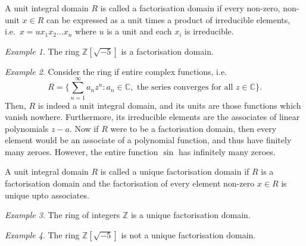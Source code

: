 \documentclass[11pt]{article}
\newcommand{\C}{\mathbb{C}}
\newcommand{\Z}{\mathbb{Z}}
\theoremstyle{definition}
\theoremstyle{remark}
\newtheorem*{example}{Example}
\numberwithin{equation}{section}
\begin{document}
    \begin{definition}
        A unit integral domain $R$ is called a factorisation domain if every
        non-zero, non-unit $x\in R$ can be expressed as a unit times a product of
        irreducible elements, i.e.\ $x = ux_1x_2\dots x_n$ where $u$ is a unit and
        each $x_i$ is irreducible.
    \end{definition}
    \begin{example}
        The ring $\Z[\sqrt{-5}]$ is a factorisation domain.
    \end{example}
    \begin{example}
        Consider the ring if entire complex functions, i.e.\ \[
            R = \{\sum_{n = 1}^\infty a_nz^n: a_n \in \C, \text{ the series converges
            for all } z \in \C\}.
        \] Then, $R$ is indeed a unit integral domain, and its units are those
        functions which vanish nowhere. Furthermore, its irreducible elements are the
        associates of linear polynomials $z - a$. Now if $R$ were to be a
        factorisation domain, then every element would be an associate of a
        polynomial function, and thus have finitely many zeroes. However, the entire
        function $\sin$ has infinitely many zeroes.
    \end{example}


    \begin{definition}
        A unit integral domain $R$ is called a unique factorisation domain if $R$ is
        a factorisation domain and the factorisation of every element non-zero $x \in
        R$ is unique upto associates.
    \end{definition}
    \begin{example}
        The ring of integers $\Z$ is a unique factorisation domain.
    \end{example}
    \begin{example}
        The ring $\Z[\sqrt{-5}]$ is not a unique factorisation domain.
    \end{example}
\end{document}
